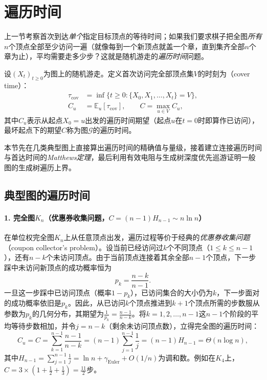 \section{遍历时间}
\label{sec:graph-walk-cover}

上一节考察首次到达\emph{单个}指定目标顶点的等待时间；如果我们要求棋子把全图\emph{所有}$n$个顶点全部至少访问一遍（就像每到一个新顶点就盖一个章，直到集齐全部$n$个章为止），平均需要走多少步？这就是随机游走的\emph{遍历时间}问题。

\begin{definition}[遍历时间]
\label{def:graph-walk-cover}
设$(X_t)_{t\geq 0}$为图上的随机游走。定义首次访问完全部顶点集$V$的时刻为（cover time）：
\begin{equation}
\begin{aligned}
\tau_{\mathrm{cov}}&=\inf\bigl\{t\ge0:\{X_0,X_1,\ldots,X_t\}=V\bigr\},\\
C_u&=\mathbb{E}_u[\tau_{\mathrm{cov}}],
\qquad C=\max_{u\in V} C_u,
\end{aligned}
\label{eq:graph-walk-cover-definition}
\end{equation}
其中$C_u$表示从起点$X_0=u$出发的遍历时间期望（起点$u$在$t=0$时即算作已访问），最坏起点下的期望$C$称为图$\mathcal G$的遍历时间。
\end{definition}

本节先在几类典型图上直接算出遍历时间的精确值与量级，接着建立连接遍历时间与首达时间的\emph{Matthews定理}，最后利用有效电阻与生成树深度优先巡游证明一般图的生成树遍历上界。

\subsection{典型图的遍历时间}
\label{sec:graph-walk-cover-computation}

\paragraph{1. 完全图$K_n$（优惠券收集问题，$C=(n-1)H_{n-1}\sim n\ln n$）}

在单位权完全图$K_n$上从任意顶点出发，遍历过程等价于经典的\emph{优惠券收集问题}（coupon collector's problem）。设当前已经访问过$k$个不同顶点（$1\leq k\leq n-1$），还有$n-k$个未访问顶点。由于当前顶点连接着其余全部$n-1$个顶点，下一步踩中未访问新顶点的成功概率恒为
\[
  p_k = \frac{n-k}{n-1}.
\]
一旦这一步踩中已访问顶点（概率$1-p_k$），已访问集合的大小仍为$k$，下一步面对的成功概率依旧是$p_k$。因此，从已访问$k$个顶点推进到$k+1$个顶点所需的步数服从参数为$p_k$的几何分布，其期望为$\frac{1}{p_k}=\frac{n-1}{n-k}$。将$k=1,2,\ldots,n-1$这$n-1$个阶段的平均等待步数相加，并令$j=n-k$（剩余未访问顶点数），立得完全图的遍历时间：
\begin{equation}
C_u = C = \sum_{k=1}^{n-1}\frac{n-1}{n-k} = (n-1)\sum_{j=1}^{n-1}\frac{1}{j} = (n-1)H_{n-1} = \Theta(n\log n),
\label{eq:graph-walk-cover-complete}
\end{equation}
其中$H_{n-1}=\sum_{j=1}^{n-1}\frac1j=\ln n+\gamma_{\mathrm{Euler}}+O(1/n)$为调和数。例如在$K_4$上，$C=3\times(1+\frac12+\frac13)=\frac{11}{2}$步。

